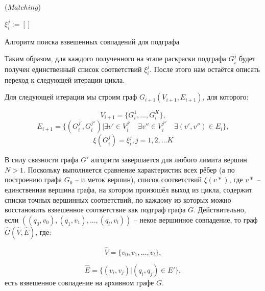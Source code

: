 \begin{algorithm}[H]
	\Large
	\Begin($Matching$){
		
		$\xi_i^j := []$
		
		
	}
	
	\caption{Алгоритм поиска взвешенных совпадений для подграфа}
	\label{alg:findall}
\end{algorithm}

Таким образом, для каждого полученного на этапе раскраски подграфа $G_i^j$ будет получен единственный список соответствий $\xi_i^j$. После этого нам остаётся описать переход к следующей итерации цикла.

Для следующей итерации мы строим граф $G_{i+1}(V_{i+1}, E_{i+1})$, для которого:

\[V_{i+1} = \{G_i^1, ..., G_i^K\}, \]
\[E_{i+1} = \{(G_i^{j'}, G_i^{j''}) | \exists v' \in V_i^{j'} \quad \exists v'' \in V_i^{j''} \quad \exists (v', v'') \in E_i \}, \]
\[\xi(G_i^j) = \xi_i^j, j = 1, 2, ... K\]

В силу связности графа $G'$ алгоритм завершается для любого лимита вершин $N > 1$. Поскольку выполняется сравнение характеристик всех рёбер (а по построению графа $G_0$ -- и меток вершин), список соответствий $\xi(v*)$, где $v*$ -- единственная вершина графа, на котором произошёл выход из цикла, содержит списки точных вершинных соответствий, по каждому из которых можно восстановить взвешенное соответствие как подграф графа $G$. Действительно, если $((q_0, v_0), (q_1, v_1), ..., (q_l, v_l))$ -- некое вершинное совпадение, то граф $\widehat{G}(\widehat{V}, \widehat{E})$, где:

\[\widehat{V} = \{v_0, v_1, ..., v_l\},\]

\[\widehat{E} = \{(v_i, v_j) | (q_i, q_j) \in E'\},\]
есть взвешенное совпадение на архивном графе $G$.